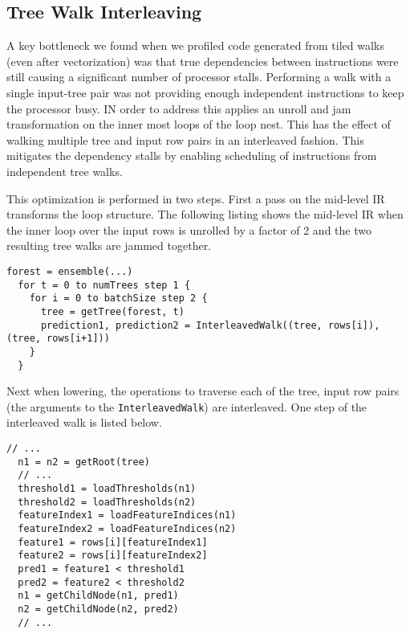 \subsection{Tree Walk Interleaving}
A key bottleneck we found when we profiled code generated from tiled walks (even after vectorization) was that true dependencies between instructions were still causing
a significant number of processor stalls. Performing a walk with a single input-tree pair was not providing enough independent instructions to keep the processor busy. IN order to address this \Treebeard{} applies an unroll and jam transformation on the inner most loops of the loop nest. This has 
the effect of walking multiple tree and input row pairs in an interleaved fashion. 
This mitigates the dependency stalls by enabling scheduling of instructions from independent tree walks. 

This optimization is performed in two steps. 
First a pass on the mid-level IR transforms the loop structure. 
The following listing shows the mid-level IR when the inner loop over the input rows is unrolled 
by a factor of 2 and the two resulting tree walks are jammed together.

\begin{lstlisting}[style=c++]
  forest = ensemble(...)
  for t = 0 to numTrees step 1 {
    for i = 0 to batchSize step 2 {
      tree = getTree(forest, t)
      prediction1, prediction2 = InterleavedWalk((tree, rows[i]), (tree, rows[i+1]))
    }
  }
\end{lstlisting}
Next when lowering, the operations to traverse each of the tree, input row pairs 
(the arguments to the \texttt{InterleavedWalk}) are interleaved. One step of the interleaved 
walk is listed below. 
\begin{lstlisting}[style=c++]
  // ... 
  n1 = n2 = getRoot(tree)
  // ...
  threshold1 = loadThresholds(n1)
  threshold2 = loadThresholds(n2)
  featureIndex1 = loadFeatureIndices(n1)
  featureIndex2 = loadFeatureIndices(n2)
  feature1 = rows[i][featureIndex1]
  feature2 = rows[i][featureIndex2]
  pred1 = feature1 < threshold1
  pred2 = feature2 < threshold2
  n1 = getChildNode(n1, pred1)
  n2 = getChildNode(n2, pred2)
  // ...
\end{lstlisting}

